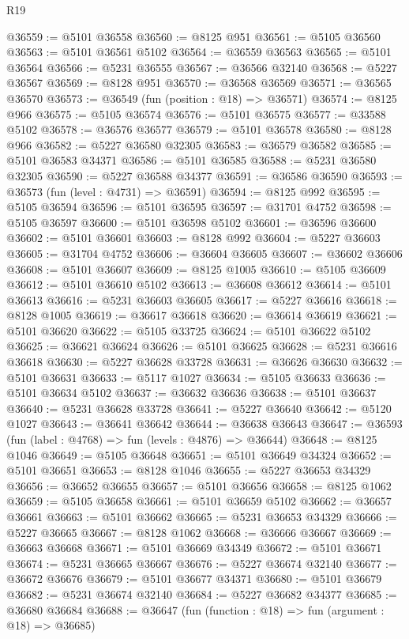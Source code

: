 \begin{lexlean}{R19}
\begin{coremodule}
{{{{{{{{{{{@36559 := @5101 @36558
@36560 := @8125 @951
@36561 := @5105 @36560
@36563 := @5101 @36561 @5102
@36564 := @36559 @36563
@36565 := @5101 @36564
@36566 := @5231 @36555
@36567 := @36566 @32140
@36568 := @5227 @36567
@36569 := @8128 @951
@36570 := @36568 @36569
@36571 := @36565 @36570
@36573 := @36549 (fun (position : @18) => @36571)
@36574 := @8125 @966
@36575 := @5105 @36574
@36576 := @5101 @36575
@36577 := @33588 @5102
@36578 := @36576 @36577
@36579 := @5101 @36578
@36580 := @8128 @966
@36582 := @5227 @36580 @32305
@36583 := @36579 @36582
@36585 := @5101 @36583 @34371
@36586 := @5101 @36585
@36588 := @5231 @36580 @32305
@36590 := @5227 @36588 @34377
@36591 := @36586 @36590
@36593 := @36573 (fun (level : @4731) => @36591)
@36594 := @8125 @992
@36595 := @5105 @36594
@36596 := @5101 @36595
@36597 := @31701 @4752
@36598 := @5105 @36597
@36600 := @5101 @36598 @5102
@36601 := @36596 @36600
@36602 := @5101 @36601
@36603 := @8128 @992
@36604 := @5227 @36603
@36605 := @31704 @4752
@36606 := @36604 @36605
@36607 := @36602 @36606
@36608 := @5101 @36607
@36609 := @8125 @1005
@36610 := @5105 @36609
@36612 := @5101 @36610 @5102
@36613 := @36608 @36612
@36614 := @5101 @36613
@36616 := @5231 @36603 @36605
@36617 := @5227 @36616
@36618 := @8128 @1005
@36619 := @36617 @36618
@36620 := @36614 @36619
@36621 := @5101 @36620
@36622 := @5105 @33725
@36624 := @5101 @36622 @5102
@36625 := @36621 @36624
@36626 := @5101 @36625
@36628 := @5231 @36616 @36618
@36630 := @5227 @36628 @33728
@36631 := @36626 @36630
@36632 := @5101 @36631
@36633 := @5117 @1027
@36634 := @5105 @36633
@36636 := @5101 @36634 @5102
@36637 := @36632 @36636
@36638 := @5101 @36637
@36640 := @5231 @36628 @33728
@36641 := @5227 @36640
@36642 := @5120 @1027
@36643 := @36641 @36642
@36644 := @36638 @36643
@36647 := @36593 (fun (label : @4768) => fun (levels : @4876) => @36644)
@36648 := @8125 @1046
@36649 := @5105 @36648
@36651 := @5101 @36649 @34324
@36652 := @5101 @36651
@36653 := @8128 @1046
@36655 := @5227 @36653 @34329
@36656 := @36652 @36655
@36657 := @5101 @36656
@36658 := @8125 @1062
@36659 := @5105 @36658
@36661 := @5101 @36659 @5102
@36662 := @36657 @36661
@36663 := @5101 @36662
@36665 := @5231 @36653 @34329
@36666 := @5227 @36665
@36667 := @8128 @1062
@36668 := @36666 @36667
@36669 := @36663 @36668
@36671 := @5101 @36669 @34349
@36672 := @5101 @36671
@36674 := @5231 @36665 @36667
@36676 := @5227 @36674 @32140
@36677 := @36672 @36676
@36679 := @5101 @36677 @34371
@36680 := @5101 @36679
@36682 := @5231 @36674 @32140
@36684 := @5227 @36682 @34377
@36685 := @36680 @36684
@36688 := @36647 (fun (function : @18) => fun (argument : @18) => @36685)
}}}}}}}}}}}
\end{coremodule}
\end{lexlean}
